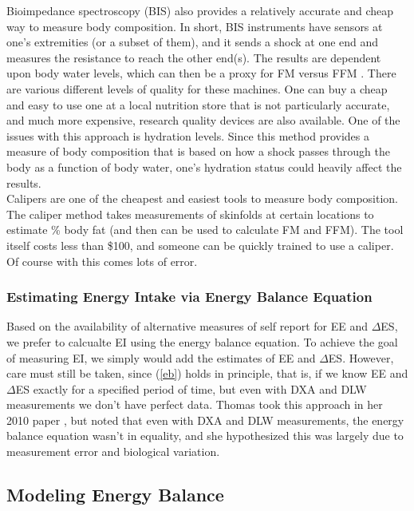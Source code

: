\documentclass[11pt]{article}\usepackage[]{graphicx}\usepackage[]{color}
\begin{document}
Bioimpedance spectroscopy (BIS) also provides a relatively accurate and cheap way to measure body composition. In short, BIS instruments have sensors at one's extremities (or a subset of them), and it sends a shock at one end and measures the resistance to reach the other end(s). The results are dependent upon body water levels, which can then be a proxy for FM versus FFM . There are various different levels of quality for these machines. One can buy a cheap and easy to use one at a local nutrition store that is not particularly accurate, and much more expensive, research quality devices are also available. One of the issues with this approach is hydration levels. Since this method provides a measure of body composition that is based on how a shock passes through the body as a function of body water, one's hydration status could heavily affect the results. \\


Calipers are one of the cheapest and easiest tools to measure body composition. The caliper method takes measurements of skinfolds at certain locations to estimate \% body fat (and then can be used to calculate FM and FFM). The tool itself costs less than \$100, and someone can be quickly trained to use a caliper. Of course with this comes lots of error. \\


\subsubsection{Estimating Energy Intake via Energy Balance Equation}

Based on the availability of alternative measures of self report for EE and $\Delta$ES, we prefer to calcualte EI using the energy balance equation. To achieve the goal of measuring EI, we simply would add the estimates of EE and $\Delta$ES. However, care must still be taken, since (\ref{eb}) holds in principle, that is, if we know EE and $\Delta$ES exactly for a specified period of time, but even with DXA and DLW measurements we don't have perfect data. Thomas took this approach in her 2010 paper \cite{thomas10}, but noted that even with DXA and DLW measurements, the energy balance equation wasn't in equality, and she hypothesized this was largely due to measurement error and biological variation.

\subsection{Modeling Energy Balance}
\end{document}
